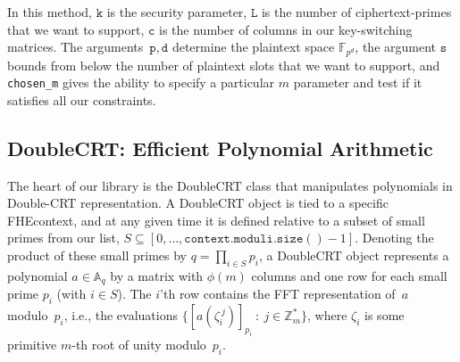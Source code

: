 \documentclass[14pt]{extarticle}
\newcommand{\A}{\mathbb{A}}
\newcommand{\F}{\mathbb{F}}
\newcommand{\Z}{\mathbb{Z}}
\def\DoubleCRT{\textsf{DoubleCRT}}
\def\FHEcontext{\textsf{FHEcontext}}
\begin{document}
\smallskip\noindent
In this method, $\mathtt{k}$ is the security parameter, $\mathtt{L}$ is the number of ciphertext-primes that we want to support, $\mathtt{c}$ is the number of columns in our key-switching matrices. The arguments~$\mathtt{p,d}$ determine the plaintext space $\F_{p^d}$, the argument $\mathtt{s}$ bounds from below the number of plaintext slots that we want to support, and \texttt{chosen\_m} gives the ability to specify a particular $m$ parameter and test if it satisfies all our constraints.

\subsection{{\DoubleCRT}: Efficient Polynomial Arithmetic}
\label{sec:DoubleCRT}
The heart of our library is the {\DoubleCRT} class that manipulates
polynomials in Double-CRT representation. A {\DoubleCRT} object is
tied to a specific {\FHEcontext}, and at any given time it is defined
relative to a subset of small primes from our list, $S\subseteq
[0,\ldots,\mathtt{context.moduli.size()}-1]$. Denoting the product of
these small primes by $q=\prod_{i\in S} p_i$, a {\DoubleCRT} object
represents a polynomial $a\in\A_q$ by a matrix with $\phi(m)$ columns
and one row for each small prime $p_i$ (with $i\in S$). The $i$'th
row contains the FFT representation of~$a$ modulo~$p_i$, i.e., the
evaluations $\{[a(\zeta_i^{~j})]_{p_i}~:~j\in\Z_m^*\}$, where
$\zeta_i$ is some primitive $m$-th root of unity modulo~$p_i$.
\end{document}
